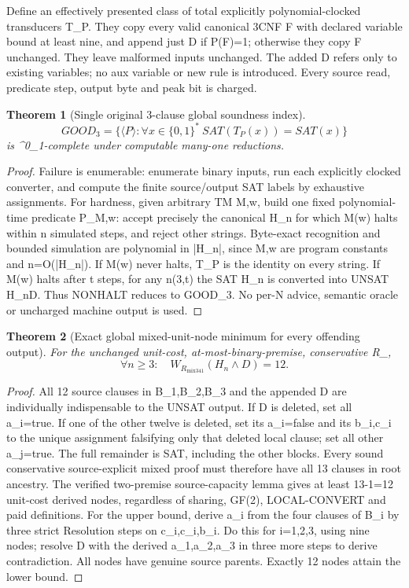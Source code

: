\documentclass[11pt]{article}
\newtheorem{theorem}{Theorem}
\begin{document}
Define an effectively presented class of total explicitly polynomial-clocked transducers T_P. They copy every valid canonical 3CNF F with declared variable bound at least nine, and append just D if P(F)=1; otherwise they copy F unchanged. They leave malformed inputs unchanged. The added D refers only to existing variables; no aux variable or new rule is introduced. Every source read, predicate step, output byte and peak bit is charged.
\begin{theorem}[Single original 3-clause global soundness index]
\[
GOOD_3=\{\langle P\rangle:\forall x\in\{0,1\}^*\
SAT(T_P(x))=SAT(x)\}
\]
is \Pi^0_1-complete under computable many-one reductions.
\end{theorem}
\begin{proof}
Failure is enumerable: enumerate binary inputs, run each explicitly clocked converter, and compute the finite source/output SAT labels by exhaustive assignments. For hardness, given arbitrary TM M,w, build one fixed polynomial-time predicate P_{M,w}: accept precisely the canonical H_n for which M(w) halts within n simulated steps, and reject other strings. Byte-exact recognition and bounded simulation are polynomial in |H_n|, since M,w are program constants and n=O(|H_n|). If M(w) never halts, T_P is the identity on every string. If M(w) halts after t steps, for any n\ge\max(3,t) the SAT H_n is converted into UNSAT H_n\wedge D. Thus NONHALT reduces to GOOD_3. No per-N advice, semantic oracle or uncharged machine output is used.
\end{proof}
\begin{theorem}[Exact global mixed-unit-node minimum for every offending output]
For the unchanged unit-cost, at-most-binary-premise, conservative R_{},
\[
\boxed{\forall n\ge3:\quad W_{R_{\mathrm{mix341}}}(H_n\wedge D)=12.}
\]
\end{theorem}
\begin{proof}
All 12 source clauses in B_1,B_2,B_3 and the appended D are individually indispensable to the UNSAT output. If D is deleted, set all a_i=true. If one of the other twelve is deleted, set its a_i=false and its b_i,c_i to the unique assignment falsifying only that deleted local clause; set all other a_j=true. The full remainder is SAT, including the other blocks. Every sound conservative source-explicit mixed proof must therefore have all 13 clauses in root ancestry. The verified two-premise source-capacity lemma gives at least 13-1=12 unit-cost derived nodes, regardless of sharing, GF(2), LOCAL-CONVERT and paid definitions. For the upper bound, derive a_i from the four clauses of B_i by three strict Resolution steps on c_i,c_i,b_i. Do this for i=1,2,3, using nine nodes; resolve D with the derived a_1,a_2,a_3 in three more steps to derive contradiction. All nodes have genuine source parents. Exactly 12 nodes attain the lower bound.
\end{proof}
\end{document}
